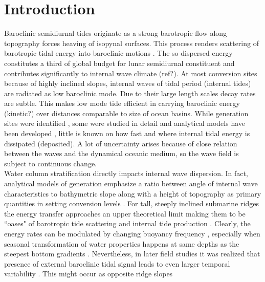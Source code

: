 \documentclass[12pt]{article}
\begin{document}
\section{Introduction}
Baroclinic semidiurnal tides originate as a strong barotropic flow along topography forces heaving 
of isopynal surfaces. This process renders scattering of barotropic tidal energy into baroclinic 
motions \citep{hendershott1981long}. The so dispersed energy constitutes a third of global budget 
for lunar semidiurnal constituent \citep{egbert2000significant, munk1997once} and contributes 
significantly to internal wave climate (ref?). At most conversion sites because of highly inclined 
slopes, internal waves of tidal period (internal tides) are radiated as low baroclinic mode. Due to 
their large length scales decay rates are subtle. This makes low mode tide efficient in carrying 
baroclinic energy (kinetic?) over distances comparable to size of ocean basins. While generation 
sites were identified \citep{morozov1995semidiurnal, simmons2004internal, arbic2010concurrent, 
zhao2016global}, some 
were studied in detail \citep{rudnick2003tides, klymak2011breaking, althaus2003internal} and 
analytical models have been developed \citep{garrett2007internal}, little is known on how fast and 
where internal tidal energy is dissipated (deposited). A lot of uncertainty arises because of close 
relation between the waves and the dynamical oceanic medium, so the wave field is subject to 
continuous change.\\
Water column stratification directly impacts internal wave dispersion. In fact, analytical models 
of generation emphasize a ratio between angle of internal wave characteristics to bathymetric slope 
\citep{garrett2007internal} along with a height of topography as primary quantities in setting 
conversion levels \citep{llewellyn2003tidal, petrelis2006tidal}. For tall, steeply inclined 
submarine ridges the energy transfer approaches an upper theoretical limit 
\citep{petrelis2006tidal, st2003generation} making them to be ``oases" of barotropic tide 
scattering 
and internal tide production \citep{morozov1995semidiurnal, egbert2000significant}. Clearly, the 
energy rates can be modulated by changing buoyancy frequency \citep{holloway1999internal}, 
especially when seasonal transformation of water properties happens at same depths as the steepest 
bottom gradients 
\citep{gerkema2004internal}. Nevertheless, in later field studies it was realized that presence of 
external baroclinic tidal signal leads to even larger temporal variability \citep{Kelly2010a, 
zilberman2011incoherent, pickering2015structure}. This might occur as opposite ridge slopes 
\end{document}
